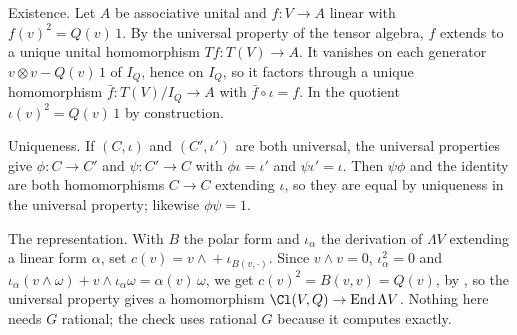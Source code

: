 Existence. Let $A$ be associative unital and $f : V \to A$ linear with $f(v)^{2} = Q(v)\,1$. By the universal property of the tensor algebra, $f$ extends to a unique unital homomorphism $T f : T(V) \to A$. It vanishes on each generator $v \otimes v - Q(v)\,1$ of $I_Q$, hence on $I_Q$, so it factors through a unique homomorphism $\bar f : T(V)/I_Q \to A$ with $\bar f \circ \iota = f$. In the quotient $\iota(v)^{2} = Q(v)\,1$ by construction.

Uniqueness. If $(C, \iota)$ and $(C', \iota')$ are both universal, the universal properties give $\phi : C \to C'$ and $\psi : C' \to C$ with $\phi \iota = \iota'$ and $\psi \iota' = \iota$. Then $\psi \phi$ and the identity are both homomorphisms $C \to C$ extending $\iota$, so they are equal by uniqueness in the universal property; likewise $\phi \psi = 1$.

The representation. With $B$ the polar form and $\iota_{\alpha}$ the derivation of $\Lambda V$ extending a linear form $\alpha$, set $c(v) = v \wedge {} + \iota_{B(v, \cdot)}$. Since $v \wedge v = 0$, $\iota_{\alpha}^{2} = 0$ and $\iota_{\alpha}(v \wedge \omega) + v \wedge \iota_{\alpha}\omega = \alpha(v)\,\omega$, we get $c(v)^{2} = B(v, v) = Q(v)$, by , so the universal property gives a homomorphism $\Cl(V, Q) \to \operatorname{End} \Lambda V$. Nothing here needs $G$ rational; the check uses rational $G$ because it computes exactly.
